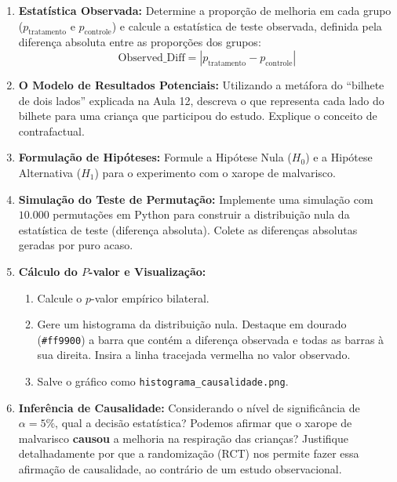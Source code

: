 \documentclass[12pt]{article}
\begin{document}
\begin{enumerate}[label=\textbf{Tarefa \arabic*}]
    \item \textbf{Estatística Observada:}
    Determine a proporção de melhoria em cada grupo ($p_{\text{tratamento}}$ e $p_{\text{controle}}$) e calcule a estatística de teste observada, definida pela diferença absoluta entre as proporções dos grupos:
    $$\text{Observed\_Diff} = |p_{\text{tratamento}} - p_{\text{controle}}|$$

    \item \textbf{O Modelo de Resultados Potenciais:}
    Utilizando a metáfora do ``bilhete de dois lados'' explicada na Aula 12, descreva o que representa cada lado do bilhete para uma criança que participou do estudo. Explique o conceito de contrafactual.

    \item \textbf{Formulação de Hipóteses:}
    Formule a Hipótese Nula ($H_0$) e a Hipótese Alternativa ($H_1$) para o experimento com o xarope de malvarisco.
    
    \item \textbf{Simulação do Teste de Permutação:}
    Implemente uma simulação com $10.000$ permutações em Python para construir a distribuição nula da estatística de teste (diferença absoluta). Colete as diferenças absolutas geradas por puro acaso.
    
    \item \textbf{Cálculo do $P$-valor e Visualização:}
    \begin{enumerate}[label=\alph*)]
        \item Calcule o $p$-valor empírico bilateral.
        \item Gere um histograma da distribuição nula. Destaque em dourado (\texttt{\#ff9900}) a barra que contém a diferença observada e todas as barras à sua direita. Insira a linha tracejada vermelha no valor observado.
        \item Salve o gráfico como \texttt{histograma\_causalidade.png}.
    \end{enumerate}

    \item \textbf{Inferência de Causalidade:}
    Considerando o nível de significância de $\alpha = 5\%$, qual a decisão estatística? Podemos afirmar que o xarope de malvarisco \textbf{causou} a melhoria na respiração das crianças? Justifique detalhadamente por que a randomização (RCT) nos permite fazer essa afirmação de causalidade, ao contrário de um estudo observacional.
\end{enumerate}
\end{document}
